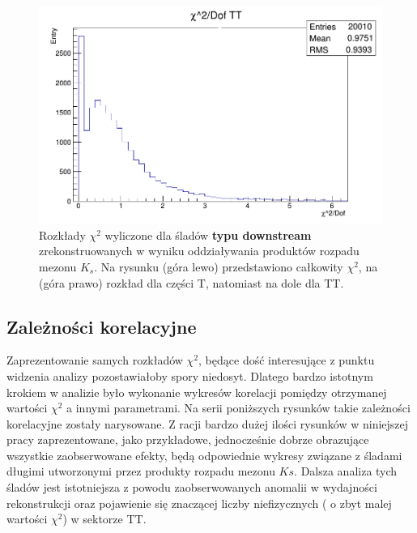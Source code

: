 \begin{figure}[H]
\vspace*{0.5cm} %
\hspace{\fill}
\begin{minipage}[t]{\textwidth}
\centering
\includegraphics[scale=0.4]{rozdzial6/KsLL_chi2TT.png}
\end{minipage}
\caption{Rozkłady $\chi^2$ wyliczone dla śladów \textbf{typu downstream} zrekonstruowanych w wyniku oddziaływania produktów rozpadu mezonu $K_s$. Na rysunku (góra lewo) przedstawiono całkowity $\chi^2$, na (góra prawo) rozkład dla części T, natomiast na dole dla  TT. } \label{chi2KsDD}
\end{figure}

\subsection{Zależności korelacyjne}
Zaprezentowanie samych rozkładów $\chi^2$, będące dość interesujące z punktu widzenia analizy pozostawiałoby spory niedosyt. Dlatego bardzo istotnym krokiem w analizie było wykonanie wykresów korelacji pomiędzy otrzymanej wartości $\chi^2$ a innymi parametrami. Na serii poniższych rysunków takie  zależności korelacyjne zostały narysowane. Z racji bardzo dużej ilości rysunków w niniejszej pracy zaprezentowane, jako przykładowe, jednocześnie dobrze obrazujące wszystkie  zaobserwowane efekty, będą odpowiednie wykresy związane z śladami długimi utworzonymi przez produkty rozpadu mezonu $Ks$. Dalsza analiza tych śladów jest istotniejsza z powodu zaobserwowanych anomalii w wydajności rekonstrukcji oraz  pojawienie się znaczącej liczby niefizycznych ( o zbyt malej wartości $\chi^2$) w sektorze TT. 

